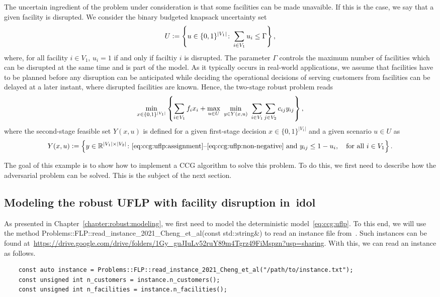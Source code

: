 The uncertain ingredient of the problem under consideration is that some
facilities can be made unavaible. If this is the case, we say that a given
facility is disrupted.
We consider the binary budgeted knapsack uncertainty set 
\begin{equation*}
    U \mathrel{{\mathop:}{=}} \left\{ u\in\{0,1\}^{|V_1|} \colon \sum_{i\in V_1} u_i \le \Gamma \right\},
\end{equation*}
where, for all facility $i\in V_1$, $u_i = 1$ if and only if faciltiy $i$ is
disrupted. The parameter $\Gamma$ controls the maximum number of facilities
which can be disrupted at the same time and is part of the model. As it
typically occurs in real-world applications, we assume that facilities have to
be planned before any disruption can be anticipated while deciding the
operational decisions of serving customers from facilities can be delayed at a
later instant, where disrupted facilities are known. Hence, the two-stage
robust problem reads 
\begin{equation*}
    \min_{x\in\{0,1\}^{|V_1|}} \Set{
        \sum_{i\in V_1} f_ix_i +
        \max_{u\in U} \ 
        \min_{ y\in Y(x,u) } \ 
        \sum_{i\in V_1} \sum_{j\in V_2} c_{ij} y_{ij}
    },
\end{equation*}
where the second-stage feasible set $Y(x,u)$ is defined for a given
first-stage decision $x\in\{0,1\}^{|V_1|}$ and a given scenario $u\in U$ as
\begin{equation*}
    Y(x,u) \mathrel{{\mathop:}{=}} \left\{ y\in\mathbb{R}^{|V_1|\times|V_2|} \colon
    \text{\eqref{eq:ccg:uflp:assignment}--\eqref{eq:ccg:uflp:non-negative} and }
    y_{ij} \le 1 - u_i, \quad \text{for all }i\in V_1 \right\}.
\end{equation*}

The goal of this example is to show how to implement a CCG algorithm to solve
this problem. To do this, we first need to describe how the adversarial
problem can be solved. This is the subject of the next section.

\subsection{Modeling the robust UFLP with facility disruption in~\textsf{idol}}

As presented in Chapter~\ref{chapter:robust:modeling}, we first need to model
the deterministic model~\eqref{eq:ccg:uflp}. To this end, we will use the
method \textsf{Problems::FLP::read\_instance\_2021\_Cheng\_et\_al(const
std::string\&)} to read an instance file from~\textcite{Cheng2021}. Such
instances can be found
at~\url{https://drive.google.com/drive/folders/1Gy_guJIuLv52ruY89m4Tgrz49FiMspzn?usp=sharing}.
With this, we can read an instance as follows. 
%
\begin{lstlisting}
    const auto instance = Problems::FLP::read_instance_2021_Cheng_et_al("/path/to/instance.txt");
    const unsigned int n_customers = instance.n_customers();
    const unsigned int n_facilities = instance.n_facilities();
\end{lstlisting}

